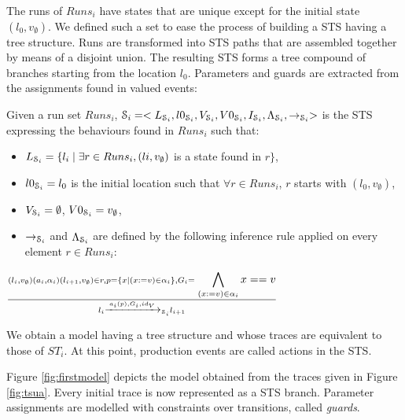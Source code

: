 The runs of $Runs_i$ have states that are unique except for the
initial state $(l_0,v_\emptyset)$. We defined such a set to
ease the process of building a STS having a tree structure.  Runs
are transformed into STS paths that are assembled together by
means of a disjoint union. The resulting STS forms a tree
compound of branches starting from the location $l_0$. Parameters
and guards are extracted from the assignments found in valued
events:

\begin{definition}
  Given a run set $Runs_i$, $\EuScript{S}_i=<L_{\EuScript{S}_i},
  l0_{\EuScript{S}_i},V_{\EuScript{S}_i}, V0_{\EuScript{S}_i},
  I_{\EuScript{S}_i},
  \Lambda_{\EuScript{S}_i},\rightarrow_{\EuScript{S}_i}>$ is the
  STS expressing the behaviours found in $Runs_i$ such that:

	\begin{itemize}
    \item $L_{\EuScript{S}_i}= \{l_i \mid \exists r\in Runs_i,
      (li,v_\emptyset)$ is a state found in $r\}$,

    \item $l0_{\EuScript{S}_i} = l_0$ is the initial location
      such that $\forall r \in Runs_i$, $r$ starts with
      $(l_0,v_\emptyset)$,

    \item $V_{\EuScript{S}_i}=\emptyset$,
      $V0_{\EuScript{S}_i}=v_\emptyset$,

    \item $\rightarrow_{\EuScript{S}_i}$ and
      $\Lambda_{\EuScript{S}_i}$ are defined by the following
      inference rule applied on every element $r\in Runs_i$:
	\end{itemize}

  \begin{center}
    $\frac{(l_i,v_\emptyset) (a_i,\alpha_i) (l_{i+1},v_\emptyset)
    \in r, p=\{x \mid (x:=v)\in \alpha_i \}, G_i=\displaystyle
  \bigwedge_{(x:=v)\in \alpha_i}x==v}{l_i \xrightarrow{a_i(p),G_i,id_V}_{\EuScript{S}_i} l_{i+1}}$
  \end{center}


  \label{IOSTS_tree}
\end{definition}

We obtain a model having a tree structure and whose traces are
equivalent to those of $ST_i$. At this point, production events
are called actions in the STS.

Figure \ref{fig:firstmodel} depicts the model obtained from the
traces given in Figure \ref{fig:tsua}. Every initial trace is now
represented as a STS branch. Parameter assignments are modelled
with constraints over transitions, called \textit{guards}.

